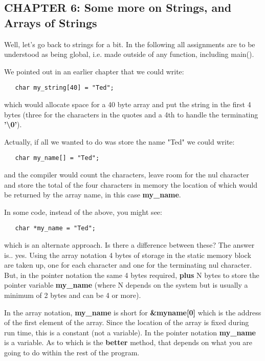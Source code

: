 \hypertarget{chapter-6-some-more-on-strings-and-arrays-of-strings}{%
\subsection{CHAPTER 6: Some more on Strings, and Arrays of
Strings}\label{chapter-6-some-more-on-strings-and-arrays-of-strings}}

Well, let's go back to strings for a bit. In the following all
assignments are to be understood as being global, i.e. made outside of
any function, including main().

We pointed out in an earlier chapter that we could write:

\begin{verbatim}
   char my_string[40] = "Ted";
\end{verbatim}

which would allocate space for a 40 byte array and put the string in the
first 4 bytes (three for the characters in the quotes and a 4th to
handle the terminating \textbf{'\textbackslash0'}).

Actually, if all we wanted to do was store the name "Ted" we could
write:

\begin{verbatim}
   char my_name[] = "Ted";
\end{verbatim}

and the compiler would count the characters, leave room for the nul
character and store the total of the four characters in memory the
location of which would be returned by the array name, in this case
\textbf{my\_name}.

In some code, instead of the above, you might see:

\begin{verbatim}
   char *my_name = "Ted";
\end{verbatim}

which is an alternate approach. Is there a difference between these? The
answer is.. yes. Using the array notation 4 bytes of storage in the
static memory block are taken up, one for each character and one for the
terminating nul character. But, in the pointer notation the same 4 bytes
required, \textbf{plus} N bytes to store the pointer variable
\textbf{my\_name} (where N depends on the system but is usually a
minimum of 2 bytes and can be 4 or more).

In the array notation, \textbf{my\_name} is short for
\textbf{\&myname{[}0{]}} which is the address of the first element of
the array. Since the location of the array is fixed during run time,
this is a constant (not a variable). In the pointer notation
\textbf{my\_name} is a variable. As to which is the \textbf{better}
method, that depends on what you are going to do within the rest of the
program.

